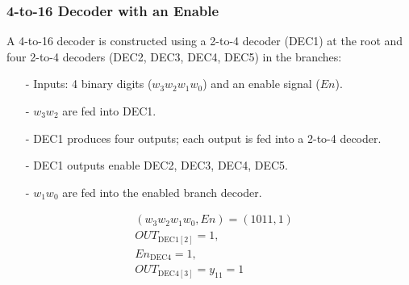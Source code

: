 \documentclass[12pt,openany]{book}
\begin{document}
\subsubsection{4-to-16 Decoder with an Enable}
\begin{minipage}[htp]{0.5\textwidth}
\begin{justify}
	A 4-to-16 decoder is constructed using a 2-to-4 decoder (DEC1) at the root and four 2-to-4 decoders (DEC2, DEC3, DEC4, DEC5) in the branches:
    \begin{itemize}[leftmargin=*]
        \item[-] Inputs: 4 binary digits (\(w_3w_2w_1w_0\)) and an enable signal (\(En\)).
        \item[-] \(w_3w_2\) are fed into DEC1.
        \item[-] DEC1 produces four outputs; each output is fed into a 2-to-4 decoder.
        \item[-] DEC1 outputs enable DEC2, DEC3, DEC4, DEC5.
        \item[-] \(w_1w_0\) are fed into the enabled branch decoder.
    \end{itemize}
		\end{justify}
	\begin{align*}
        &\left(w_3w_2w_1w_0, En\right) = (1011, 1)\\
        &OUT_{\text{DEC1}[2]} = 1, \\
        &En_{\text{DEC4}} = 1,\\
        &OUT_{\text{DEC4}[3]} = y_{11} = 1
    \end{align*}
\end{minipage} \hfill
\vline
\hfill
\end{document}
